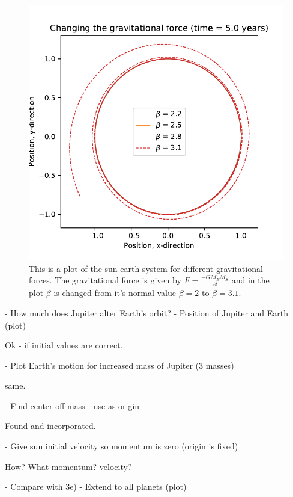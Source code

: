 \begin{figure}[H]
\includegraphics[width=1.1\linewidth]{../results/plots/diffenrent_gravitation.pdf}\caption{This is a plot of the sun-earth system for different gravitational forces. The gravitational force is given by $ F = \frac{-GM_EM_S}{r^\beta}$ and in the plot $\beta$ is changed from it's normal value $\beta = 2$ to $\beta = 3.1$.}\label{fig:different_gravitation}
\end{figure}

	- How much does Jupiter alter Earth's orbit?
	- Position of Jupiter and Earth (plot)	
	
	

	Ok - if initial values are correct.
	
	- Plot Earth's motion for increased mass of Jupiter (3 masses)

	same.	
	
	- Find center off mass - use as origin

	Found and incorporated.	
	
	- Give sun initial velocity so momentum is zero (origin is fixed)

	How? What momentum? velocity?	
	
	- Compare with 3e)
	- Extend to all planets (plot)
	
